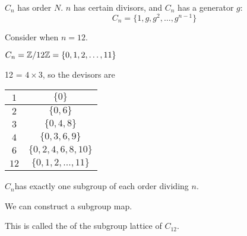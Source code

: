 \begin{example}
    $C_n$ has order $N$. $n$ has certain divisors, and $C_n$ has a generator $g$: \[
        C_n = \{ 1, g, g^2, \dots, g^{n - 1} \}
    \]

    Consider when $n = 12$. 

    $C_n = \mathbb{Z} / 12\mathbb{Z} = \{ 0, 1, 2, \dots, 11 \}$

    12 = $4 \times 3$, so the devisors are 

    \begin{table}[ht!]
        \centering
        \begin{tabular}{c|c}
            $1$  & $\{ 0 \}$ \\ \hline
            $2$  & $\{ 0, 6 \}$ \\ \hline
            $3$ & $\{ 0, 4, 8 \}$ \\ \hline
            $4$ & $\{ 0, 3, 6, 9 \}$ \\ \hline
            $6$ & $\{ 0, 2, 4, 6, 8, 10 \}$ \\ \hline
            $12$ & $\{ 0, 1, 2, \dots, 11 \}$
        \end{tabular}
    \end{table}

    $C_n$has exactly one subgroup of each order dividing $n$.

    We can construct a subgroup map. 

    \begin{figure}[ht!]
        \centering
        
    \end{figure}

    This is called the  of the subgroup lattice of $C_{12}$.
\end{example}